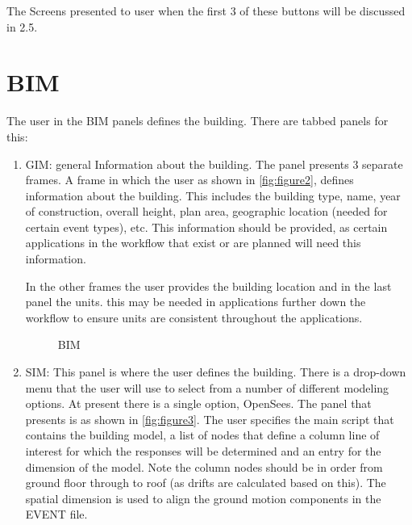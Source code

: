 The Screens presented to user when the first 3 of these buttons will be discussed in 2.5.

\section{BIM}
The user in the BIM panels defines the building. There are tabbed panels for this:
\begin{enumerate}
\item	GIM: general Information about the building. The panel presents 3 separate frames. A frame in which the user as shown in \autoref{fig:figure2}, 
defines information about the building. This includes the building type, name, year of construction, overall height, plan area, geographic location (needed for certain event types), etc. 
This information should be provided, as certain applications in the workflow that exist or are planned will need this information. 


In the other frames the user provides the building location and in the last panel the units. this may be needed in applications further down the workflow to ensure units are consistent throughout the applications. 

\begin{figure}[!htbp]
  \caption{BIM}
  \label{fig:figure2}
\end{figure}


\item SIM: This panel is where the user defines the building. 
There is a drop-down menu that the user will use to select from a number of different modeling options. 
At present there is a single option, OpenSees. 
The panel that presents is as shown in \autoref{fig:figure3}. 
The user specifies the main script that contains the building model, 
a list of nodes that define a column line of interest for which the responses will be determined and an entry for the dimension of the model. 
Note the column nodes should be in order from ground floor through to roof (as drifts are calculated based on this). 
The spatial dimension is used to align the ground motion components in the EVENT file.


\end{enumerate}
